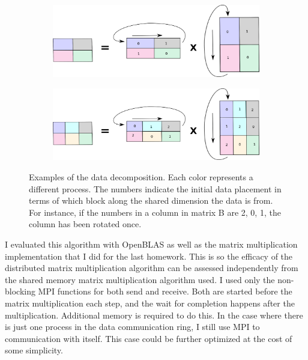 \documentclass{article}
\begin{document}
\begin{figure}
\begin{subfigure}{.9\textwidth}
  \centering
  \includegraphics[width=.9\linewidth]{figures/fig_2_2.png}
\end{subfigure}
\begin{subfigure}{.9\textwidth}
  \centering
  \includegraphics[width=.9\linewidth]{figures/fig_2_3.png}
\end{subfigure}
\caption{Examples of the data decomposition. Each color represents a different process. 
The numbers indicate the initial data placement in terms of which block along the shared dimension
the data is from. For instance, if the numbers in a column in matrix B are 2, 0, 1, the column has 
been rotated once.}
\label{fig:fig}
\end{figure}

I evaluated this algorithm with OpenBLAS as well as the matrix multiplication implementation that I did for 
the last homework. This is so the efficacy of the distributed matrix multiplication algorithm can
be assessed independently from the shared memory matrix multiplication algorithm used. I used only the
non-blocking MPI functions for both send and receive. Both are started before the matrix multiplication
each step, and the wait for completion happens after the multiplication. Additional memory
is required to do this. In the case where there is just one process in the data communication ring,
I still use MPI to communication with itself. This case could be further optimized at the cost of some
simplicity.

\section{}
\end{document}

